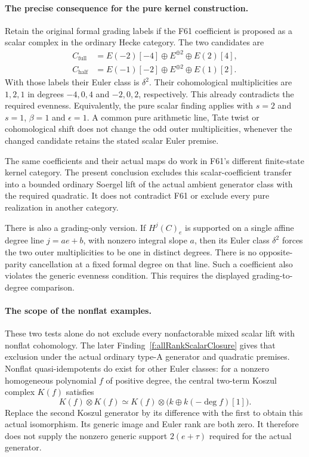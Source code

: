 \documentclass[11pt,a4paper]{article}
\newcommand{\fid}[1]{\textsf{#1}}\newcommand{\gate}[1]{\textsf{#1}}
\theoremstyle{named}\newtheorem{finding}{Finding}[section]
\theoremstyle{definition}\newtheorem{definition}[finding]{Definition}
\theoremstyle{remark}\newtheorem{remark}[finding]{Remark}
\begin{document}
\paragraph{The precise consequence for the pure kernel construction.}
Retain the original formal grading labels if the
\fid{F61} coefficient is proposed as a scalar complex
in the ordinary Hecke category. The two candidates are
\[
 \begin{aligned}
 C_{\mathrm{full}}
   &=E(-2)[-4]\oplus E^{\oplus2}\oplus E(2)[4],\\
 C_{\mathrm{half}}
   &=E(-1)[-2]\oplus E^{\oplus2}\oplus E(1)[2].
 \end{aligned}
\]
With those labels their Euler class is \(\delta^2\).
Their cohomological multiplicities are \(1,2,1\) in
degrees \(-4,0,4\) and \(-2,0,2\), respectively.
This already contradicts the required evenness.
Equivalently, the pure scalar finding applies with
\(s=2\) and \(s=1\), \(\beta=1\) and \(\epsilon=1\).
A common pure arithmetic line, Tate twist or
cohomological shift does not change the odd outer
multiplicities, whenever the changed candidate retains
the stated scalar Euler premise.

The same coefficients and their actual maps do work
in \fid{F61}'s different finite-state kernel category.
The present conclusion excludes this scalar-coefficient
transfer into a bounded ordinary Soergel lift of the
actual ambient generator class with the required
quadratic. It does not contradict \fid{F61} or exclude
every pure realization in another category.

There is also a grading-only version. If
\(H^j(C)_e\) is supported on a single affine degree
line \(j=ae+b\), with nonzero integral slope \(a\),
then its Euler class \(\delta^2\) forces the two
outer multiplicities to be one in distinct degrees.
There is no opposite-parity cancellation at a fixed
formal degree on that line. Such a coefficient also
violates the generic evenness condition.
This requires the displayed grading-to-degree comparison.

\paragraph{The scope of the nonflat examples.}
These two tests alone do not exclude every nonfactorable
mixed scalar lift with nonflat cohomology. The later
Finding~\ref{f:allRankScalarClosure} gives that exclusion
under the actual ordinary type-A generator and quadratic
premises. Nonflat quasi-idempotents do exist for other
Euler classes: for a nonzero homogeneous polynomial \(f\)
of positive degree,
the central two-term Koszul complex \(K(f)\) satisfies
\[
 K(f)\otimes K(f)
   \simeq K(f)\otimes
             \bigl(k\oplus k(-\deg f)[1]\bigr).
\]
Replace the second Koszul generator by its difference
with the first to obtain this actual isomorphism.
Its generic image and Euler rank are both zero.
It therefore does not supply the nonzero generic
support \(2(e+\tau)\) required for the actual generator.
\end{document}
